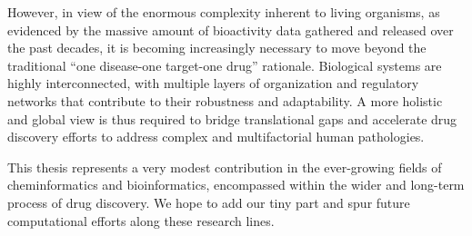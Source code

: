 However, in view of the enormous complexity inherent to living organisms, as evidenced by the massive amount of bioactivity data gathered and released over the past decades, it is becoming increasingly necessary to move beyond the traditional “one disease-one target-one drug” rationale. Biological systems are highly interconnected, with multiple layers of organization and regulatory networks that contribute to their robustness and adaptability. A more holistic and global view is thus required to bridge translational gaps and accelerate drug discovery efforts to address complex and multifactorial human pathologies.

This thesis represents a very modest contribution in the ever-growing fields of cheminformatics and bioinformatics, encompassed within the wider and long-term process of drug discovery. We hope to add our tiny part and spur future computational efforts along these research lines.


